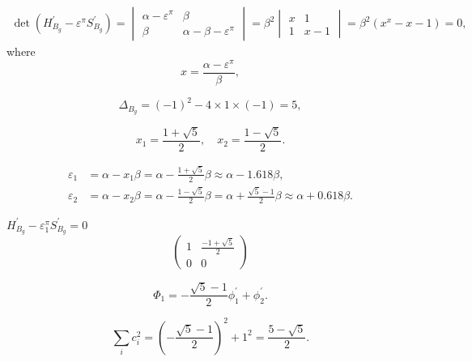 \documentclass[a4paper]{book}
\newcommand{\Hp}{H^\prime}
\newcommand{\Sp}{S^\prime}
\begin{document}
\begin{solution}
\begin{enumerate}[label=(\alph*)]
		\begin{align*}
			\det(\Hp_{B_g}-\varepsilon^\pi \Sp_{B_g}) = \begin{vmatrix}	
			\alpha-\varepsilon^\pi	&	\beta \\ 
			\beta & \alpha - \beta -\varepsilon^\pi	
\end{vmatrix} = \beta^2
\begin{vmatrix}
			x & 1 \\ 1 & x -1			
			\end{vmatrix} = \beta^2 ( x^x - x - 1 ) = 0,
		\end{align*}
		where
		\begin{equation*}
			x = \frac{\alpha-\varepsilon^\pi}{\beta},
		\end{equation*}
		
		\begin{equation*}
			\Delta_{B_g} = (-1)^2 - 4 \times 1 \times (-1) = 5,
		\end{equation*}				
		
		\begin{equation*}
			x_1 = \frac{1+\sqrt{5}}{2}, \quad x_2 = \frac{1-\sqrt{5}}{2}.
		\end{equation*}
		
		\begin{align*}
			\varepsilon_1 &= \alpha - x_1 \beta = \alpha - \frac{1+\sqrt{5}}{2} \beta \approx \alpha - 1.618 \beta , \\
			\varepsilon_2 &= \alpha - x_2 \beta = \alpha - \frac{1-\sqrt{5}}{2} \beta = \alpha + \frac{\sqrt{5}-1}{2} \beta \approx \alpha + 0.618 \beta .
		\end{align*}
		
		$\Hp_{B_g}-\varepsilon^\pi_1 \Sp_{B_g} = 0$
		\begin{equation*}
			\begin{pmatrix}
				1	& \frac{-1+\sqrt{5}}{2}	\\	0	&	0
			\end{pmatrix}
		\end{equation*}				
		
		
		\begin{equation*}
			\Phi_1 = -\frac{\sqrt{5}-1}{2}\phi^\prime_1 + \phi^\prime_2.
		\end{equation*}
		
		\begin{equation*}
			\sum_{i} c^2_i = (-\frac{\sqrt{5}-1}{2})^2 + 1^2 = \frac{5-\sqrt{5}}{2}.
		\end{equation*}
		

\end{enumerate}
\end{solution}
\end{document}
